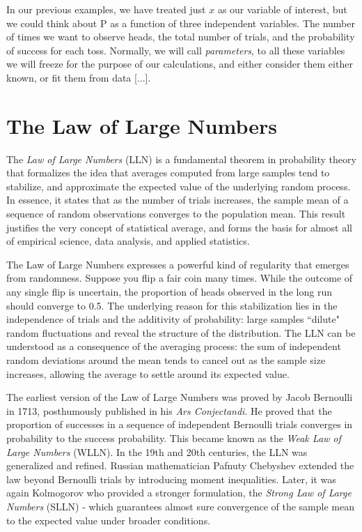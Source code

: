 \documentclass{book}
\begin{document}
In our previous examples, we have treated just $x$ as our variable of interest, but we could think about P as a function of three independent variables. The number of times we want to observe heads, the total number of trials, and the probability of success for each toss. Normally, we will call \textit{parameters}, to all these variables we will freeze for the purpose of our calculations, and either consider them either known, or fit them from data [...].
 
 \newpage 
 
\section{The Law of Large Numbers}

The \textit{Law of Large Numbers} (LLN) is a fundamental theorem in probability theory that formalizes the idea that averages computed from large samples tend to stabilize, and approximate the expected value of the underlying random process. In essence, it states that as the number of trials increases, the sample mean of a sequence of random observations converges to the population mean. This result justifies the very concept of statistical average, and forms the basis for almost all of empirical science, data analysis, and applied statistics.

\medskip

The Law of Large Numbers expresses a powerful kind of regularity that emerges from randomness. Suppose you flip a fair coin many times. While the outcome of any single flip is uncertain, the proportion of heads observed in the long run should converge to 0.5. The underlying reason for this stabilization lies in the independence of trials and the additivity of probability: large samples ``dilute" random fluctuations and reveal the structure of the distribution. The LLN can be understood as a consequence of the averaging process: the sum of independent random deviations around the mean tends to cancel out as the sample size increases, allowing the average to settle around its expected value.

\medskip

The earliest version of the Law of Large Numbers was proved by {Jacob Bernoulli} in 1713, posthumously published in his \textit{Ars Conjectandi}. He proved that the proportion of successes in a sequence of independent Bernoulli trials converges in probability to the success probability. This became known as the \textit{Weak Law of Large Numbers} (WLLN). In the 19th and 20th centuries, the LLN was generalized and refined. Russian mathematician Pafnuty Chebyshev extended the law beyond Bernoulli trials by introducing moment inequalities. Later, it was again Kolmogorov who provided a stronger formulation, the \textit{Strong Law of Large Numbers} (SLLN) - which guarantees almost sure convergence of the sample mean to the expected value under broader conditions.
\end{document}
